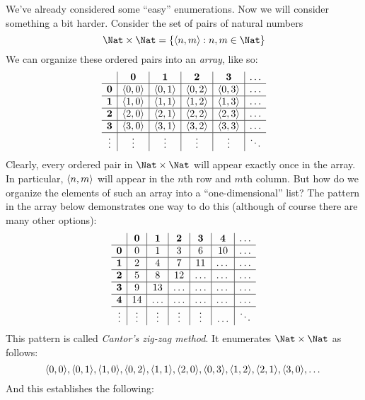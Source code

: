 \documentclass[../../../include/open-logic-section]{subfiles}
\begin{document}


\begin{explain}
We've already considered some ``easy'' enumerations. Now we will
consider something a bit harder. Consider the set of pairs of natural
numbers
\[
\Nat \times \Nat = \Setabs{\tuple{n,m}}{n,m \in \Nat}
\]
We can organize these ordered pairs into an \emph{array}, like so:
\[
\begin{array}{ c | c | c | c | c | c}
& \mathbf 0 & \mathbf 1 & \mathbf 2 & \mathbf 3 & \dots \\
\hline
\mathbf 0 & \tuple{0,0} & \tuple{0,1} & \tuple{0,2} & \tuple{0,3} & \dots \\
\hline
\mathbf 1 & \tuple{1,0} & \tuple{1,1} & \tuple{1,2} & \tuple{1,3} & \dots \\
\hline
\mathbf 2 & \tuple{2,0} & \tuple{2,1} & \tuple{2,2} & \tuple{2,3} & \dots \\
\hline
\mathbf 3 & \tuple{3,0} & \tuple{3,1} & \tuple{3,2} & \tuple{3,3} & \dots \\
\hline
\vdots & \vdots & \vdots & \vdots & \vdots & \ddots\\
\end{array}
\]
Clearly, every ordered pair in $\Nat \times \Nat$ will appear
exactly once in the array. In particular, $\langle n,m \rangle$ will appear in
the $n$th row and $m$th column. But how do we organize the elements of
such an array into a ``one-dimensional'' list? The pattern in the array below
demonstrates one way to do this (although of course there are many other options):
\[
\begin{array}{ c | c | c | c | c | c | c}
& \mathbf 0 & \mathbf 1 & \mathbf 2 & \mathbf 3 & \mathbf 4 &\dots \\
\hline
\mathbf 0 & 0  & 1& 3 & 6& 10 &\ldots \\
\hline
\mathbf 1 &2 & 4& 7 & 11 & \dots &\ldots \\
\hline
\mathbf 2 & 5 & 8 & 12 & \ldots & \dots&\ldots \\
\hline
\mathbf 3 & 9 & 13 & \ldots & \ldots & \dots & \ldots \\
\hline
\mathbf 4 & 14 & \ldots & \ldots & \ldots & \dots & \ldots \\
\hline
\vdots & \vdots & \vdots & \vdots & \vdots&\ldots & \ddots\\
\end{array}
\]\noindent
This pattern is called \emph{Cantor's zig-zag method}. It  enumerates
$\Nat \times \Nat$ as follows:
\[
\langle 0,0 \rangle, \langle 0,1 \rangle, \langle 1,0 \rangle, \langle 0,2 \rangle, \langle 1,1 \rangle,
\langle 2,0 \rangle, \langle 0,3 \rangle, \langle 1,2 \rangle, \langle 2,1 \rangle, \langle 3,0 \rangle, \dots
\]
And this establishes the following:
\end{explain}
\end{document}
